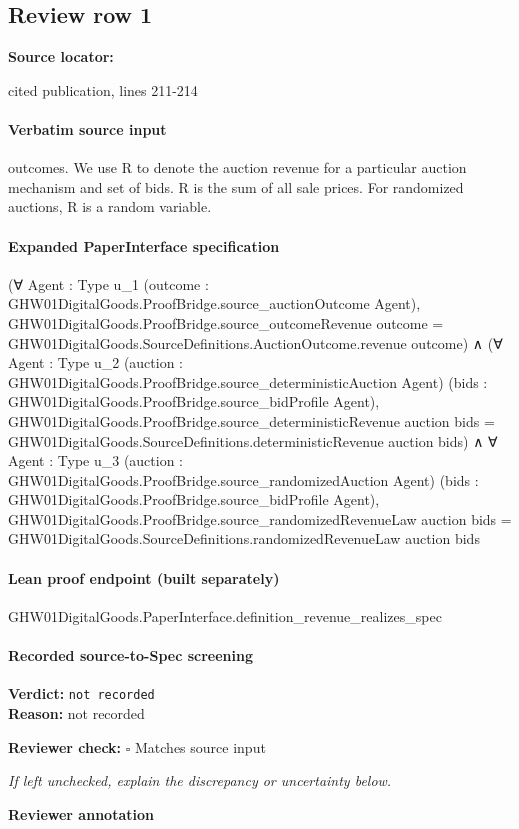 \documentclass[10pt]{article}
\newcommand{\reviewerbox}{%
  \par\noindent\fbox{\parbox{0.96\linewidth}{\rule{0pt}{0.38in}}}\par
}
\newcommand{\reviewmatch}[1]{%
  \par\noindent\textbf{Reviewer check:} $\square$\; #1\par
  \noindent\emph{If left unchecked, explain the discrepancy or uncertainty below.}\par
}
\begin{document}
\subsection*{Review row 1}
\textbf{Source locator:} {\footnotesize\raggedright cited publication, lines 211-\allowbreak{}214\par}
\paragraph{Verbatim source input}
\begin{ReviewVerbatim}
outcomes. We use R to denote the auction revenue
for a particular auction mechanism and set of bids. R
is the sum of all sale prices. For randomized auctions,
R is a random variable.
\end{ReviewVerbatim}


\paragraph{Expanded PaperInterface specification}
\begin{ReviewVerbatim}
(∀ {Agent : Type u_1} (outcome : GHW01DigitalGoods.ProofBridge.source_auctionOutcome Agent),
    GHW01DigitalGoods.ProofBridge.source_outcomeRevenue outcome =
      GHW01DigitalGoods.SourceDefinitions.AuctionOutcome.revenue outcome) ∧
  (∀ {Agent : Type u_2} (auction : GHW01DigitalGoods.ProofBridge.source_deterministicAuction Agent)
      (bids : GHW01DigitalGoods.ProofBridge.source_bidProfile Agent),
      GHW01DigitalGoods.ProofBridge.source_deterministicRevenue auction bids =
        GHW01DigitalGoods.SourceDefinitions.deterministicRevenue auction bids) ∧
    ∀ {Agent : Type u_3} (auction : GHW01DigitalGoods.ProofBridge.source_randomizedAuction Agent)
      (bids : GHW01DigitalGoods.ProofBridge.source_bidProfile Agent),
      GHW01DigitalGoods.ProofBridge.source_randomizedRevenueLaw auction bids =
        GHW01DigitalGoods.SourceDefinitions.randomizedRevenueLaw auction bids
\end{ReviewVerbatim}

\paragraph{Lean proof endpoint (built separately)}\begin{ReviewVerbatim}
GHW01DigitalGoods.PaperInterface.definition_revenue_realizes_spec
\end{ReviewVerbatim}

\paragraph{Recorded source-to-Spec screening}
\textbf{Verdict:} \texttt{not recorded}
\\
\textbf{Reason:} not recorded
\reviewmatch{Matches source input}
\noindent\textbf{Reviewer annotation}\par
\reviewerbox
\clearpage
\hypertarget{source-claim-fcc1c57101887a67}{}
\end{document}
